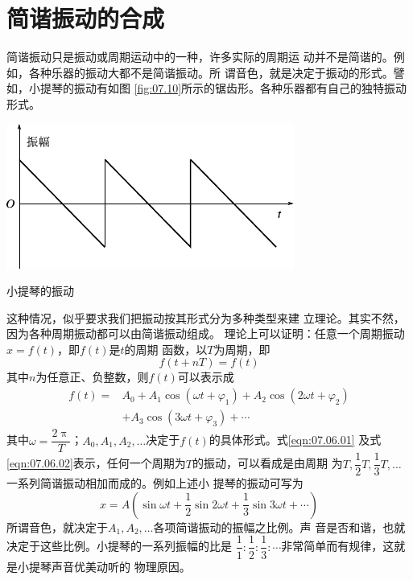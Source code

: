 \section{简谐振动的合成}\label{sec:07.06}

简谐振动只是振动或周期运动中的一种，许多实际的周期运
\clearpage
\noindent 动并不是简谐的。例如，各种乐器的振动大都不是简谐振动。所
谓音色，就是决定于振动的形式。譬如，小提琴的振动有如图
\ref{fig:07.10}\;所示的锯齿形。各种乐器都有自己的独特振动形式。

\begin{figurex}
  \centering
  \includegraphics{figure/fig07.10}
  \caption{小提琴的振动}
  \label{fig:07.10}
\end{figurex}
\vspace{0.5em}

这种情况，似乎要求我们把振动按其形式分为多种类型来建
立理论。其实不然，因为各种周期振动都可以由简谐振动组成。
理论上可以证明：任意一个周期振动$ x = f \left( t \right) $，即$ f \left( t \right) $是$ t $的周期
函数，以$ T $为周期，即
\begin{equation}\label{eqn:07.06.01}
  f \left( t + n T \right) = f ( t )
\end{equation}
其中$ n $为任意正、负整数，则$ f \left( t \right) $可以表示成
{\setlength{\mathindent}{4em}
\begin{equation}\label{eqn:07.06.02}
  \begin{aligned}
    f \left( t \right) = & A _ { 0 } + A _ { 1 } \cos \left( \omega t + \varphi _ { 1 } \right) + A _ { 2 } \cos \left( 2 \omega t + \varphi _ { 2 } \right) \\
                         & + A _ { 3 } \cos \left( 3 \omega t + \varphi _ { 3 } \right) + \cdots
  \end{aligned}
\end{equation}}
其中$\omega = \dfrac { 2 \uppi } { T } $；$ A _ { 0 }, A _ { 1 }, A _ { 2 }, \dots $决定于$ f \left( t \right) $的具体形式。式\eqref{eqn:07.06.01}
及式\eqref{eqn:07.06.02}表示，任何一个周期为$ T $的振动，可以看成是由周期
为$ T, \dfrac { 1 } { 2 } T , \dfrac { 1 } { 3 } T  , \dots $一系列简谐振动相加而成的。例如上述小
提琴的振动可写为
\begin{equation*}
  x = A \left( \sin \omega t + \frac { 1 } { 2 } \sin 2 \omega t + \frac { 1 } { 3 } \sin 3 \omega t + \cdots \right)
\end{equation*}
所谓音色，就决定于$ A _ { 1 } , A _ { 2 }, \dots $各项简谐振动的振幅之比例。声
音是否和谐，也就决定于这些比例。小提琴的一系列振幅的比是
$ \dfrac { 1 } { 1 } : \dfrac { 1 } { 2 } : \dfrac { 1 } { 3 }
  : \cdots $非常简单而有规律，这就是小提琴声音优美动听的
物理原因。

